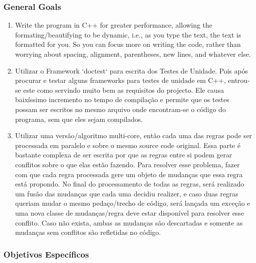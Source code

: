 \begin{englishtext}
\subsubsection{General Goals}

    \begin{enumerate}[leftmargin=*]

        \item Write the program in C++ for greater performance, allowing the
        formating/beautifying to be dynamic, i.e., as you type the text, the
        text is formatted for you. So you can focus more on writing the code,
        rather than worrying about spacing, alignment, parentheses, new lines,
        and whatever else.

        \item

        Utilizar o Framework `doctest` para escrita dos Testes de Unidade. Pois após procurar e
        testar alguns frameworks para testes de unidade em C++, entrou-se este como servindo muito
        bem as requisitos do projecto. Ele causa baixíssimo incremento no tempo de compilação e
        permite que os testes possam ser escritos no mesmo arquivo onde encontram-se o código do
        programa, sem que eles sejam compilados.

        \item

        Utilizar uma versão/algoritmo multi-core, então cada uma das regras pode ser processada em
        paralelo e sobre o mesmo source code original. Essa parte é bastante complexa de ser escrita
        por que as regras entre si podem gerar conflitos sobre o que elas estão fazendo. Para
        resolver esse problema, fazer com que cada regra processada gere um objeto de mudanças que
        essa regra está propondo. No final do processamento de todas as regras, será realizado um
        fusão das mudanças que cada uma decidiu realizer, e caso duas regras queriam mudar o mesmo
        pedaço/trecho de código, será lançada um exceção e uma nova classe de mudanças/regra deve
        estar disponível para resolver esse conflito. Caso não exista, ambas as mudanças são
        descartadas e somente as mudanças sem conflitos são refletidas no código.

    \end{enumerate}


\subsubsection{Objetivos Específicos}



\end{englishtext}

